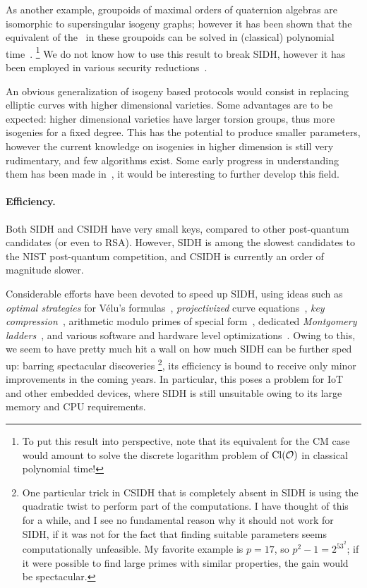\documentclass[b5layout]{hdr}
\begin{document}
As another example, groupoids of maximal orders of quaternion algebras
are isomorphic to supersingular isogeny graphs; however it has been
shown that the equivalent of the~ in these groupoids
can be solved in (classical) polynomial
time~\cite{kohel2014quaternion}.%
\footnote{To put this result into perspective, note that its
  equivalent for the CM case would amount to solve the discrete
  logarithm problem of $\operatorname{Cl}(\mathcal{O})$ in classical polynomial time!} %
We do not know how to use this result to break SIDH, however it has
been employed in various security
reductions~\cite{galbraithsecurity,10.1007/978-3-319-78372-7_11}.

An obvious generalization of isogeny based protocols would consist in
replacing elliptic curves with higher dimensional varieties. %
Some advantages are to be expected: higher dimensional varieties have
larger torsion groups, thus more isogenies for a fixed degree. %
This has the potential to produce smaller parameters, however the
current knowledge on isogenies in higher dimension is still very
rudimentary, and few algorithms exist. %
Some early progress in understanding them has been made
in~\cite{lubicz_robert_2012,lubicz_robert_2015,cosset2015computing,ionica2014isogeny,Brooks2017},
it would be interesting to further develop this field. %

\paragraph{Efficiency.}
Both SIDH and CSIDH have very small keys, compared to other
post-quantum candidates (or even to RSA). %
However, SIDH is among the slowest candidates to the NIST post-quantum
competition, and CSIDH is currently an order of magnitude slower. %

Considerable efforts have been devoted to speed up SIDH, using ideas
such as \emph{optimal strategies} for Vélu's
formulas~\cite{defeo+jao+plut12}, \emph{projectivized} curve
equations~\cite{costello2016sidh}, \emph{key
  compression}~\cite{azarderakhsh2016key,Costello2017,10.1007/978-3-319-79063-3_12},
arithmetic modulo primes of special
form~\cite{costello2016sidh,vercauteren-sidh-fp,8023082}, dedicated
\emph{Montgomery ladders}~\cite{flor_sidh_x64}, and various software
and hardware level optimizations~\cite{cryptoeprint:2017:1213}. %
Owing to this, we seem to have pretty much hit a wall on how much SIDH
can be further sped up: barring spectacular discoveries%
\footnote{One particular trick in CSIDH that is completely absent in
  SIDH is using the quadratic twist to perform part of the
  computations. %
  I have thought of this for a while, and I see no fundamental reason
  why it should not work for SIDH, if it was not for the fact that
  finding suitable parameters seems computationally unfeasible. %
  My favorite example is $p=17$, so $p^2-1=2^53^2$; if it were
  possible to find large primes with similar properties, the gain
  would be spectacular.}, %
its efficiency is bound to receive only minor improvements in the
coming years. %
In particular, this poses a problem for IoT and other embedded
devices, where SIDH is still unsuitable owing to its large memory and
CPU requirements. %
\end{document}
